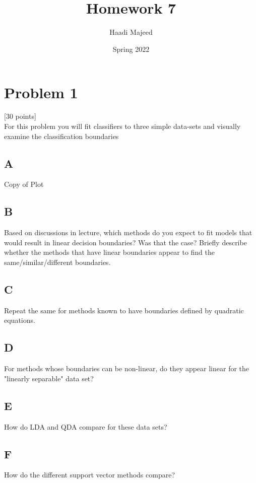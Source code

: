\documentclass[12pt]{article}
\title{ \course \\\large Homework 7 }
\author{ Haadi Majeed }
\date{Spring 2022}
\begin{document}
\maketitle
\pagebreak

\pagebreak
\section{Problem 1}
 [30 points]\\ For this problem you will fit classifiers to three simple data-sets and visually examine the classification boundaries\\
\subsection{A}
Copy of Plot

\subsection{B}
Based on discussions in lecture, which methods do you expect to fit models that would result in linear decision boundaries? Was that the case? Briefly describe whether the methods that have linear boundaries appear to find the same/similar/different boundaries.

\subsection{C}
Repeat the same for methods known to have boundaries defined by quadratic equations.

\subsection{D}
For methods whose boundaries can be non-linear, do they appear linear for the "linearly separable" data set?

\subsection{E}
How do LDA and QDA compare for these data sets?

\subsection{F}
How do the different support vector methods compare?

\end{document}
